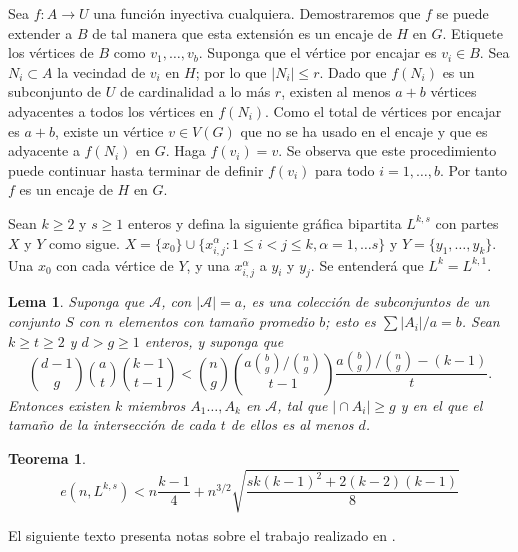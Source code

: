 \documentclass[14pt]{article}
\newtheorem{lema}[section]{Lema}
\newtheorem{theorem}{Teorema}
\begin{document}
  Sea $f: A \rightarrow U$ una función inyectiva cualquiera.
  Demostraremos que $f$ se puede extender a $B$ de tal manera que
  esta extensión es un encaje de $H$ en $G$. Etiquete los vértices de $B$ como
  $v_1, \ldots, v_b$. Suponga que el vértice por encajar es $v_i \in
  B$. Sea $N_i \subset A$ la vecindad de $v_i$ en $H$; por lo que
  $\vert N_i \vert \leq r$. Dado que $f(N_i)$ es un subconjunto de
  $U$ de cardinalidad a lo más $r$, existen al menos $a + b$ vértices
  adyacentes a todos los vértices en $f(N_i)$. Como el total de
  vértices por encajar es $a + b$, existe un vértice $v \in V(G)$ que
  no se ha usado en el encaje y que es adyacente a $f(N_i)$ en $G$.
  Haga $f(v_i)  = v$. Se observa que este procedimiento puede
  continuar hasta terminar de definir $f(v_i)$ para todo $i = 1,
  \ldots, b$. Por tanto $f$ es un encaje de  $H$ en $G$.

  Sean $k \geq 2$ y $s \geq 1$ enteros y defina la siguiente gráfica
  bipartita $L^{k, s}$ con partes $X$ y $Y$ como sigue. $X = \{x_0\}
  \cup \{x_{i,j}^\alpha: 1 \leq i < j \leq k, \alpha = 1, \ldots s
  \}$ y $Y = \{y_1, \ldots, y_k\}$. Una $x_0$ con cada vértice de
  $Y$, y una $x^{\alpha}_{i, j}$ a $y_i$ y $y_j$. Se entenderá que
  $L^k = L^{k, 1}$.

  \begin{lema}
    Suponga que $\mathcal{A}$, con $\vert \mathcal{A} \vert  = a$, es
    una colección de subconjuntos de un conjunto $S$ con $n$
    elementos con tamaño promedio $b$; esto es
    $\sum \vert A_i \vert / a = b$. Sean $k \geq t \geq 2$ y $d >
    g \geq 1$ enteros, y suponga que
    $$ \binom{d-1}{g} \binom{a}{t} \binom{k-1}{t-1} < \binom{n}{g}
    \binom{ a \binom{b}{g} / \binom{n}{g}}{t - 1} \frac{ a
    \binom{b}{g} / \binom{n}{g} - (k-1)}{t}.$$
    Entonces existen $k$ miembros $A_1 \ldots, A_k$ en $\mathcal{A}$,
    tal que $\vert \cap A_i \vert \geq g$ y en el que el tamaño de la
    intersección de cada $t$ de ellos es al menos $d$. %
  \end{lema}

  \begin{theorem}
    $$e (n, L^{k, s}) < n \frac{k-1}{4} + n^{3/2} \sqrt{\frac{sk (k -
    1)^2 + 2(k - 2)(k-1)}{8}}$$
  \end{theorem}

  El siguiente texto presenta notas sobre el trabajo realizado en
  \cite{furedi1991}.

  \printbibliography
  
\end{document}
